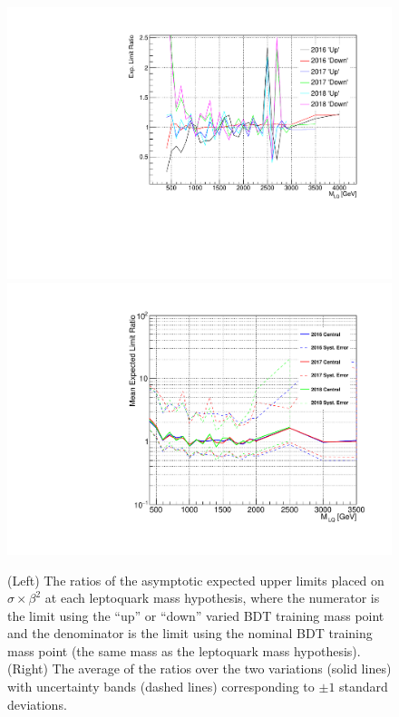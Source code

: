 \begin{figure}[htbp]
    \centering
    {\includegraphics[width=.49\textwidth]{Images/Analysis/BDT_Study_plots/BDTStudyLimitRatio.pdf}}
    {\includegraphics[width=.49\textwidth]{Images/Analysis/BDT_Study_plots/BDTStudyLimitAverageRatio2016_RmHighMass.pdf}}
    \caption{(Left) The ratios of the asymptotic expected upper limits placed on $\sigma\times\beta^2$ at each leptoquark mass hypothesis, where the numerator is the limit using the ``up'' or ``down'' varied BDT training mass point and the denominator is the limit using the nominal BDT training mass point (the same mass as the leptoquark mass hypothesis). (Right) The average of the ratios over the two variations (solid lines) with uncertainty bands (dashed lines) corresponding to $\pm 1$ standard deviations.}
    \label{figapp:BDTratio}
\end{figure}
